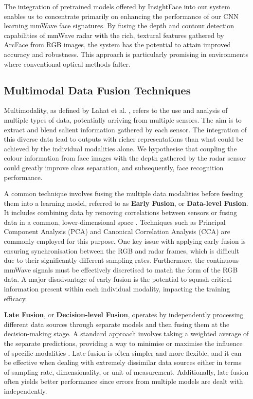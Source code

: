 \documentclass{interim}
\begin{document}
The integration of pretrained models offered by InsightFace into our system enables us to concentrate primarily on enhancing the performance of our CNN learning mmWave face signatures. By fusing the depth and contour detection capabilities of mmWave radar with the rich, textural features gathered by ArcFace from RGB images, the system has the potential to attain improved accuracy and robustness. This approach is particularly promising in environments where conventional optical methods falter.


\subsection{Multimodal Data Fusion Techniques}
\label{background:multimodal_data_fusion_techniques}
Multimodality, as defined by Lahat et al. \cite{lahat2015multimodal}, refers to the use and analysis of multiple types of data, potentially arriving from multiple sensors. The aim is to extract and blend salient information gathered by each sensor. The integration of this diverse data lead to outputs with richer representations than what could be achieved by the individual modalities alone. We hypothesise that coupling the colour information from face images with the depth gathered by the radar sensor could greatly improve class separation, and subsequently, face recognition performance.

A common technique involves fusing the multiple data modalities before feeding them into a learning model, referred to as \textbf{Early Fusion}, or \textbf{Data-level Fusion}. It includes combining data by removing correlations between sensors or fusing data in a common, lower-dimensional space \cite{khaleghi2013multisensor}. Techniques such as Principal Component Analysis (PCA) and Canonical Correlation Analysis (CCA) are commonly employed for this purpose. One key issue with applying early fusion is ensuring synchronisation between the RGB and radar frames, which is difficult due to their significantly different sampling rates. Furthermore, the continuous mmWave signals must be effectively discretised to match the form of the RGB data. A major disadvantage of early fusion is the potential to squash critical information present within each individual modality, impacting the training efficacy.

\textbf{Late Fusion}, or \textbf{Decision-level Fusion}, operates by independently processing different data sources through separate models and then fusing them at the decision-making stage. A standard approach involves taking a weighted average of the separate predictions, providing a way to minimise or maximise the influence of specific modalities \cite{pawlowski2023effective}. Late fusion is often simpler and more flexible, and it can be effective when dealing with extremely dissimilar data sources either in terms of sampling rate, dimensionality, or unit of measurement. Additionally, late fusion often yields better performance since errors from multiple models are dealt with independently.
\end{document}
